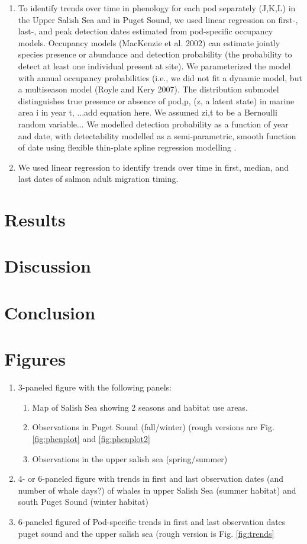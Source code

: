 \documentclass{article}
\begin{document}
\begin{enumerate}
\begin{enumerate}
\item To identify trends over time in phenology for each pod separately (J,K,L) in the Upper Salish Sea and in Puget Sound, we used linear regression on first-, last-, and peak detection dates estimated from pod-specific occupancy models. Occupancy models (MacKenzie et al. 2002) can estimate jointly species presence or abundance and detection probability (the probability to detect at least one individual present at site). We parameterized the model with annual occupancy probabilities (i.e., we did not fit a dynamic model, but a multiseason model (Royle and Kery 2007). The distribution submodel distinguishes true presence or absence of pod,p, (z, a latent state) in marine area i in year t, ...add equation here. We assumed zi,t to be a Bernoulli random variable...
We modelled detection probability as a function of year and date, with detectability modelled as a semi-parametric, smooth function of date using flexible thin-plate spline regression modelling \citep{strebel2014}. 

\item We used linear regression to identify trends over time in first, median, and last dates of salmon adult migration timing.
\end{enumerate}
\end{enumerate}


\section*{Results}
\section*{Discussion}
\section*{Conclusion}

\section* {Figures}
\begin{enumerate}
\item 3-paneled figure with the following panels: 
\begin{enumerate}
\item Map of Salish Sea showing 2 seasons and habitat use areas.
\item Observations in Puget Sound (fall/winter) (rough versions are Fig. \ref{fig:phenplot} and \ref{fig:phenplot2}
\item Observations in the upper salish sea (spring/summer)
\end{enumerate}
\item 4- or 6-paneled figure with trends in first and last observation dates (and number of whale days?) of whales in upper Salish Sea (summer habitat) and south Puget Sound (winter habitat)
\item 6-paneled figured of Pod-specific trends in first and last observation dates puget sound and the upper salish sea (rough version is Fig. \ref{fig:trends}
\end{enumerate}
\end{document}
